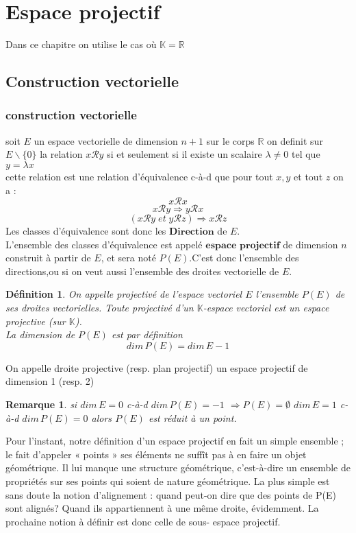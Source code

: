 \documentclass[12pt]{report}
\newtheorem{madef}{Définition}[section]
\newtheorem{rmq}{Remarque}[section]
\begin{document}
\section{Espace projectif}
Dans ce chapitre on utilise le cas où $\mathbb{K}=\mathbb{R}$
\subsection{Construction vectorielle} 
\subsubsection{construction vectorielle}
soit $E$ un espace vectorielle de dimension $n+1$ sur le corps $\mathbb{R}$
on definit sur $E\backslash\{0\}$ la relation $x\mathcal{R} y$ si et seulement si il existe un scalaire $\lambda \neq 0$ tel que $y=\lambda x$ \\
cette relation est une relation  d'équivalence c-à-d que pour tout $x,y$ et tout $z$ on a :\\
$$x\mathcal{R} x$$
$$x\mathcal{R} y\Rightarrow y\mathcal{R} x$$
$$(x\mathcal{R} y \;et\; y\mathcal{R} z) \Rightarrow x\mathcal{R} z$$
Les classes d'équivalence sont donc les $\textbf{Direction}$ de $E$.\\
L'ensemble des classes d'équivalence est appelé $\textbf{espace projectif}$ de dimension $n$ construit à partir de $E$,
et sera noté $P(E)$.C'est donc l'ensemble des directions,ou si on veut aussi l'ensemble des droites vectorielle de $E$.
\begin{madef}
On appelle projectivé de l'espace vectoriel $E$ l'ensemble $P(E)$ de ses droites vectorielles. Toute projectivé d'un $\mathbb{K}$-espace vectoriel est un espace projective (sur $\mathbb{K}$).\\
La dimension de $P(E)$ est par définition
$$dim\,P(E)=dim\,E-1$$
\end{madef}
On appelle droite projective (resp. plan projectif) un espace projectif de dimension 1 (resp. 2)
\begin{rmq}
 si $dim\,E=0$ c-à-d $dim\,P(E)=-1$ $\Rightarrow P(E)= \emptyset$    
 $dim\,E=1$ c-à-d $dim\,P(E)=0$ alors $P(E)$ est réduit à un point.
\end{rmq}
Pour l'instant, notre définition d'un espace projectif en fait un 
simple ensemble ; le fait d'appeler « points » ses éléments ne suffît 
pas à en faire un objet géométrique. Il lui manque une structure 
géométrique, c'est-à-dire un ensemble de propriétés sur ses points 
qui soient de nature géométrique. La plus simple est sans doute 
la notion d'alignement : quand peut-on dire que des points de 
P(E) sont alignés? Quand ils appartiennent à une même droite, 
évidemment. La prochaine notion à définir est donc celle de sous- 
espace projectif. \\
\end{document}
